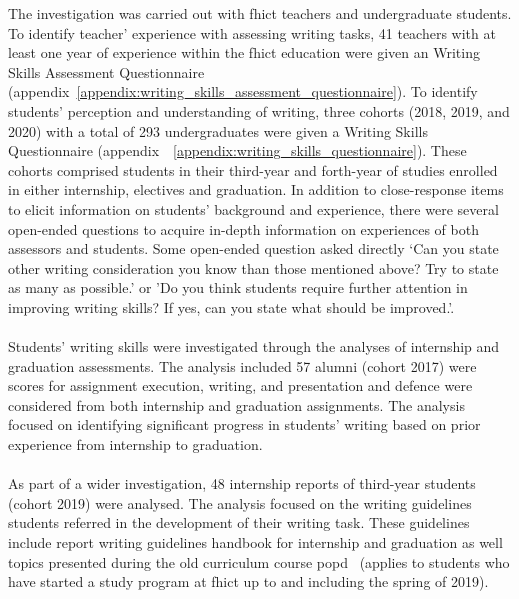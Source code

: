 

The investigation was carried out with \acrshort{fhict} teachers and undergraduate students. 
To identify teacher' experience with assessing writing tasks, 41 teachers with at least one year of experience within the \acrshort{fhict} education were given an Writing Skills Assessment  Questionnaire (appendix~\ref{appendix:writing_skills_assessment_questionnaire}).
To identify students’ perception and understanding of writing, three cohorts (2018, 2019, and 2020) with a total of 293 undergraduates were given a Writing Skills Questionnaire (appendix~~\ref{appendix:writing_skills_questionnaire}). 
These cohorts comprised students in their third-year and forth-year of studies enrolled in either internship, electives and graduation. 
In addition to close-response items to elicit information on students’ background and experience, there were several open-ended questions to acquire in-depth information on experiences of both assessors and students.
Some open-ended question asked directly ‘Can you state other writing consideration you know than those mentioned above? Try to state as many as possible.’ or 'Do you think students require further attention in improving writing skills? If yes, can you state what should be improved.'.
\\\\
Students' writing skills were investigated through the analyses of internship and graduation assessments. The analysis included 57 alumni (cohort 2017) were scores for assignment execution, writing, and presentation and defence were considered from both internship and graduation assignments. The analysis focused on identifying significant progress in students' writing based on prior experience from internship to graduation.
\\\\
As part of a wider investigation,
48 internship reports of third-year students (cohort 2019) were analysed. The analysis focused on the writing guidelines students referred in the development of their writing task. These guidelines include report writing guidelines handbook for internship and graduation  as well topics presented during the old curriculum course \acrfull{popd}~\cite{fhictpopd2} (applies to students who have started a study program at \acrshort{fhict} up to and including the spring of 2019).
